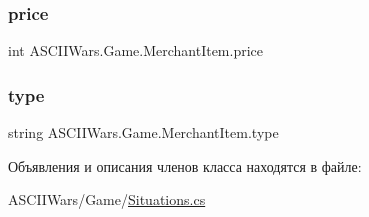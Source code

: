 \subsubsection{\texorpdfstring{price}{price}}
{\footnotesize\ttfamily int A\+S\+C\+I\+I\+Wars.\+Game.\+Merchant\+Item.\+price}

\hypertarget{class_a_s_c_i_i_wars_1_1_game_1_1_merchant_item_a0621b09ff9dc3029f660e32b90db815c}{}\label{class_a_s_c_i_i_wars_1_1_game_1_1_merchant_item_a0621b09ff9dc3029f660e32b90db815c} 
\subsubsection{\texorpdfstring{type}{type}}
{\footnotesize\ttfamily string A\+S\+C\+I\+I\+Wars.\+Game.\+Merchant\+Item.\+type}



Объявления и описания членов класса находятся в файле\+:\begin{DoxyCompactItemize}
\item 
A\+S\+C\+I\+I\+Wars/\+Game/\hyperlink{_situations_8cs}{Situations.\+cs}\end{DoxyCompactItemize}
